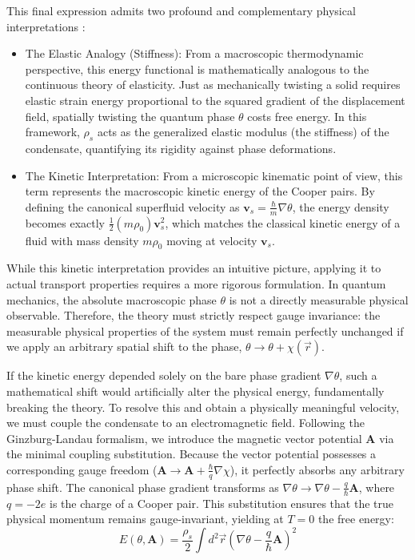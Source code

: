 \documentclass[english,binding=0.6cm,noexaminfo]{sapthesis}
\newcommand{\rhos}{\rho_s}
\begin{document}
This final expression admits two profound and complementary physical interpretations \cite{chaikin1995principles}:
\begin{itemize}
    \item The Elastic Analogy (Stiffness): From a macroscopic thermodynamic perspective, this energy functional is mathematically analogous to the continuous theory of elasticity. Just as mechanically twisting a solid requires elastic strain energy proportional to the squared gradient of the displacement field, spatially twisting the quantum phase $\theta$ costs free energy. In this framework, $\rhos$ acts as the generalized elastic modulus (the stiffness) of the condensate, quantifying its rigidity against phase deformations.
    \item The Kinetic Interpretation: From a microscopic kinematic point of view, this term represents the macroscopic kinetic energy of the Cooper pairs. By defining the canonical superfluid velocity as $\mathbf{v}_s = \frac{\hbar}{m}\nabla\theta$, the energy density becomes exactly $\frac{1}{2}(m\rho_0)\mathbf{v}_s^2$, which matches the classical kinetic energy of a fluid with mass density $m\rho_0$ moving at velocity $\mathbf{v}_s$.
\end{itemize}

While this kinetic interpretation provides an intuitive picture, applying it to actual transport properties requires a more rigorous formulation. In quantum mechanics, the absolute macroscopic phase $\theta$ is not a directly measurable physical observable. Therefore, the theory must strictly respect gauge invariance: the measurable physical properties of the system must remain perfectly unchanged if we apply an arbitrary spatial shift to the phase, $\theta \to \theta + \chi(\vec{r})$. 

If the kinetic energy depended solely on the bare phase gradient $\nabla\theta$, such a mathematical shift would artificially alter the physical energy, fundamentally breaking the theory. To resolve this and obtain a physically meaningful velocity, we must couple the condensate to an electromagnetic field. Following the Ginzburg-Landau formalism, we introduce the magnetic vector potential $\mathbf{A}$ via the minimal coupling substitution. Because the vector potential possesses a corresponding gauge freedom ($\mathbf{A} \to \mathbf{A} + \frac{\hbar}{q}\nabla\chi$), it perfectly absorbs any arbitrary phase shift. The canonical phase gradient transforms as $\nabla\theta \to \nabla\theta - \frac{q}{\hbar}\mathbf{A}$, where $q = -2e$ is the charge of a Cooper pair. This substitution ensures that the true physical momentum remains gauge-invariant, yielding at $T=0$ the free energy:
\begin{equation}
    E(\theta, \mathbf{A}) = \frac{\rhos}{2} \int d^2\vec{r} \left( \nabla\theta - \frac{q}{\hbar}\mathbf{A} \right)^2
\end{equation}
\end{document}
